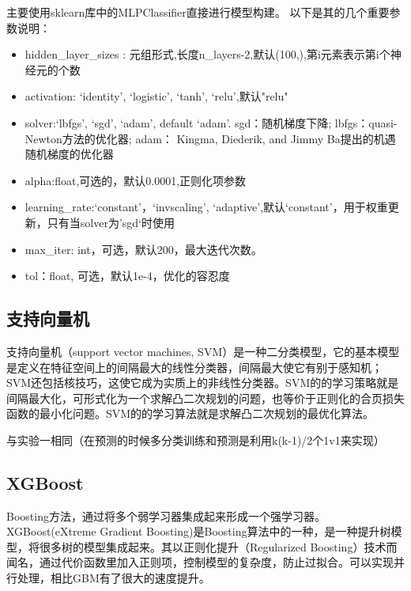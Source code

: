 \documentclass[UTF8,a4paper,AutoFakeBold,AutoFakeSlant]{article}
\begin{document}
主要使用sklearn库中的MLPClassifier直接进行模型构建。
以下是其的几个重要参数说明：
\begin{itemize}
  \item hidden\_layer\_sizes : 元组形式,长度n\_layers-2,默认(100,),第i元素表示第i个神经元的个数
  \item activation: {‘identity’, ‘logistic’, ‘tanh’, ‘relu’},默认"relu"
  \item solver:{‘lbfgs’, ‘sgd’, ‘adam’}, default ‘adam’. sgd：随机梯度下降; lbfgs：quasi-Newton方法的优化器; adam： Kingma, Diederik, and Jimmy Ba提出的机遇随机梯度的优化器
  \item alpha:float,可选的，默认0.0001,正则化项参数
  \item learning\_rate:{‘constant’，‘invscaling’, ‘adaptive’},默认‘constant’，用于权重更新，只有当solver为’sgd‘时使用
  \item max\_iter: int，可选，默认200，最大迭代次数。
  \item tol：float, 可选，默认1e-4，优化的容忍度
\end{itemize}



\subsection{支持向量机}

支持向量机（support vector machines, SVM）是一种二分类模型，它的基本模型是定义在特征空间上的间隔最大的线性分类器，间隔最大使它有别于感知机；SVM还包括核技巧，这使它成为实质上的非线性分类器。SVM的的学习策略就是间隔最大化，可形式化为一个求解凸二次规划的问题，也等价于正则化的合页损失函数的最小化问题。SVM的的学习算法就是求解凸二次规划的最优化算法。

与实验一相同（在预测的时候多分类训练和预测是利用k(k-1)/2个1v1来实现）



\subsection{XGBoost}

Boosting方法，通过将多个弱学习器集成起来形成一个强学习器。XGBoost(eXtreme Gradient Boosting)是Boosting算法中的一种，是一种提升树模型，将很多树的模型集成起来。其以正则化提升（Regularized Boosting）技术而闻名，通过代价函数里加入正则项，控制模型的复杂度，防止过拟合。可以实现并行处理，相比GBM有了很大的速度提升。
\end{document}
